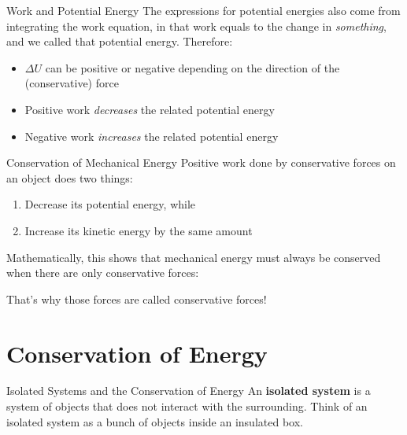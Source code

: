 \documentclass[12pt,compress,aspectratio=169]{beamer}
\newcommand{\eq}[2]{\vspace{#1}{\Large\begin{displaymath}#2\end{displaymath}}}
\begin{document}
\begin{frame}{Work and Potential Energy}
  The expressions for potential energies also come from integrating the work
  equation, in that work equals to the change in \emph{something}, and we
  called that potential energy. Therefore:

  \eq{-.2in}{
    W=-\Delta U
  }
  \begin{itemize}
  \item\vspace{-.15in}$\Delta U$ can be positive or negative depending on the
    direction of the (conservative) force
  \item Positive work \emph{decreases} the related potential energy
  \item Negative work \emph{increases} the related potential energy
  \end{itemize}
\end{frame}



\begin{frame}{Conservation of Mechanical Energy}
  Positive work done by conservative forces on an object does two things:
  \begin{enumerate}[1.]
  \item Decrease its potential energy, while
  \item Increase its kinetic energy by the same amount
  \end{enumerate}
  Mathematically, this shows that mechanical energy must always be conserved
  when there are only conservative forces:

  \eq{-.15in}{
    W=-\Delta U = \Delta K \quad\longrightarrow\quad
    \Delta K + \Delta U =0
  }

  That's why those forces are called conservative forces!
\end{frame}



\section{Conservation of Energy}

\begin{frame}{Isolated Systems and the Conservation of Energy}
  An \textbf{isolated system} is a system of objects that does not interact with
  the surrounding. Think of an isolated system as a bunch of objects inside an
  insulated box.
  \begin{center}
  \end{center}
\end{frame}
\end{document}
